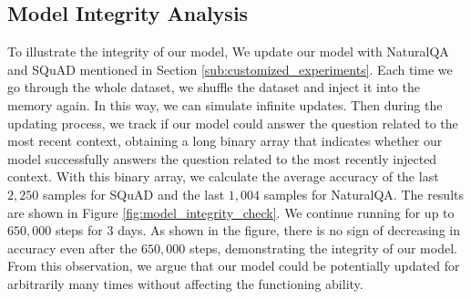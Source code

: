 \subsection{Model Integrity Analysis}
\label{sub:model_integrity_analysis}
To illustrate the integrity of our model, 
We update our model with NaturalQA and SQuAD mentioned in Section \ref{sub:customized_experiments}. 
Each time we go through the whole dataset, we shuffle the dataset and inject it into the memory again. In this way, we can simulate infinite updates. Then during the updating process, we track if our model could answer the question related to the most recent context, obtaining a long binary array that indicates whether our model successfully answers the question related to the most recently injected context. With this binary array, we calculate the average accuracy of the last $2,250$ samples for SQuAD and the last $1,004$ samples for NaturalQA. The results are shown in Figure \ref{fig:model_integrity_check}. We continue running for up to $650,000$ steps for $3$ days. As shown in the figure, there is no sign of decreasing in accuracy even after the $650,000$ steps, demonstrating the integrity of our model. From this observation, we argue that our model could be potentially updated for arbitrarily many times without affecting the functioning ability. 


\vspace{-5pt}
